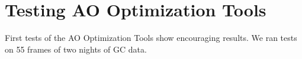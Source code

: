 \section{Testing AO Optimization Tools}
\label{sec:testing}

First tests of the AO Optimization Tools show encouraging results. We ran tests on 55 frames of two nights of GC data. 
  